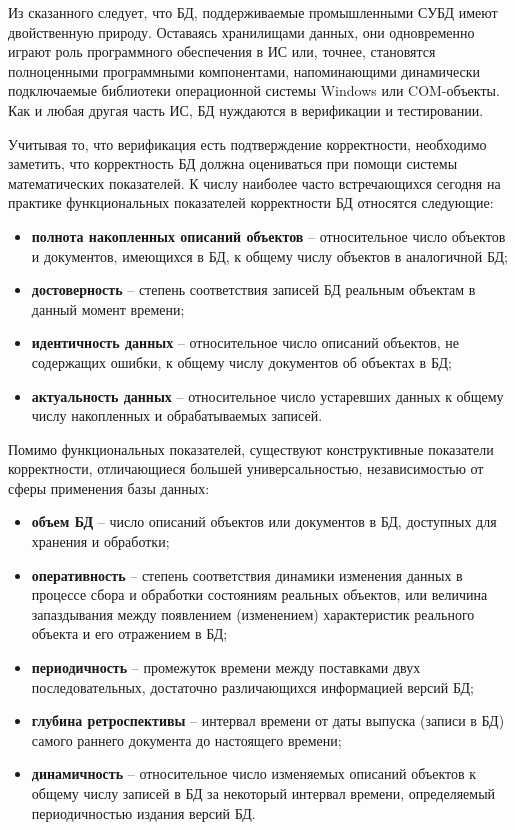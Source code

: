 Из сказанного следует, что БД, поддерживаемые промышленными СУБД имеют двойственную природу. Оставаясь хранилищами
данных, они одновременно играют роль программного обеспечения в ИС или, точнее, становятся полноценными программными
компонентами, напоминающими динамически подключаемые библиотеки операционной системы Windows или COM-объекты.
Как и любая другая часть ИС, БД нуждаются в верификации и тестировании.

Учитывая то, что верификация есть подтверждение корректности, необходимо заметить, что корректность БД
должна оцениваться при помощи системы математических показателей. К числу наиболее часто встречающихся сегодня на
практике функциональных показателей корректности БД относятся следующие:
\begin{itemize}
    \item \textbf{полнота накопленных описаний объектов} – относительное число объектов и документов, имеющихся
    в БД, к общему числу объектов в аналогичной БД;

    \item \textbf{достоверность} – степень соответствия записей БД реальным объектам в данный момент времени;

    \item \textbf{идентичность данных} – относительное число описаний объектов, не содержащих ошибки,
    к общему числу документов об объектах в БД;

    \item \textbf{актуальность данных} – относительное число устаревших данных к общему числу накопленных
    и обрабатываемых записей.
\end{itemize}

Помимо функциональных показателей, существуют конструктивные показатели корректности, отличающиеся большей
универсальностью, независимостью от сферы применения базы данных:
\begin{itemize}
    \item \textbf{объем БД} – число описаний объектов или документов в БД, доступных для хранения и обработки;

    \item \textbf{оперативность} – степень соответствия динамики изменения данных в процессе сбора и обработки
    состояниям реальных объектов, или величина запаздывания между появлением (изменением) характеристик
    реального объекта и его отражением в БД;

    \item \textbf{периодичность} – промежуток времени между поставками двух последовательных, достаточно
    различающихся информацией версий БД;

    \item \textbf{глубина ретроспективы} – интервал времени от даты выпуска (записи в БД) самого раннего
    документа до настоящего времени;

    \item \textbf{динамичность} – относительное число изменяемых описаний объектов к общему числу записей в
    БД за некоторый интервал времени, определяемый периодичностью издания версий БД.
\end{itemize}

